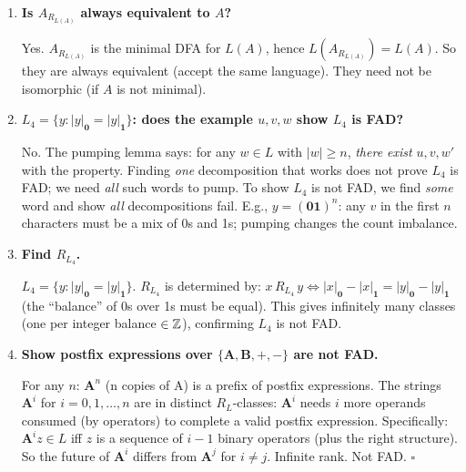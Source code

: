 \begin{enumerate}[{2.}1.]
Example 1.5 is a specific DFA; $R^M$ has as many classes as there are reachable states, and $R_{L(M)}$ has as many as the minimal machine. If Example 1.5 is minimal, they coincide; otherwise $R^M$ strictly refines $R_{L(M)}$.

\item \textbf{Is $A_{R_{L(A)}}$ always equivalent to $A$?}

Yes. $A_{R_{L(A)}}$ is the minimal DFA for $L(A)$, hence $L(A_{R_{L(A)}})=L(A)$. So they are always equivalent (accept the same language). They need not be isomorphic (if $A$ is not minimal).

\item \textbf{$L_4=\{y:|y|_\mathbf{0}=|y|_\mathbf{1}\}$: does the example $u,v,w$ show $L_4$ is FAD?}

No. The pumping lemma says: for any $w\in L$ with $|w|\geq n$, \emph{there exist} $u,v,w'$ with the property. Finding \emph{one} decomposition that works does not prove $L_4$ is FAD; we need \emph{all} such words to pump. To show $L_4$ is not FAD, we find \emph{some} word and show \emph{all} decompositions fail. E.g., $y=(\mathbf{01})^n$: any $v$ in the first $n$ characters must be a mix of 0s and 1s; pumping changes the count imbalance.

\item \textbf{Find $R_{L_4}$.}

$L_4=\{y:|y|_\mathbf{0}=|y|_\mathbf{1}\}$. $R_{L_4}$ is determined by: $x\,R_{L_4}\,y\Leftrightarrow|x|_\mathbf{0}-|x|_\mathbf{1}=|y|_\mathbf{0}-|y|_\mathbf{1}$ (the ``balance'' of 0s over 1s must be equal). This gives infinitely many classes (one per integer balance $\in\mathbb{Z}$), confirming $L_4$ is not FAD.

\item \textbf{Show postfix expressions over $\{\mathbf{A},\mathbf{B},\mathbf{+},\mathbf{-}\}$ are not FAD.}

For any $n$: $\mathbf{A}^n$ (n copies of A) is a prefix of postfix expressions. The strings $\mathbf{A}^i$ for $i=0,1,\ldots,n$ are in distinct $R_L$-classes: $\mathbf{A}^i$ needs $i$ more operands consumed (by operators) to complete a valid postfix expression. Specifically: $\mathbf{A}^i z\in L$ iff $z$ is a sequence of $i-1$ binary operators (plus the right structure). So the future of $\mathbf{A}^i$ differs from $\mathbf{A}^j$ for $i\neq j$. Infinite rank. Not FAD. $\square$


\end{enumerate}
